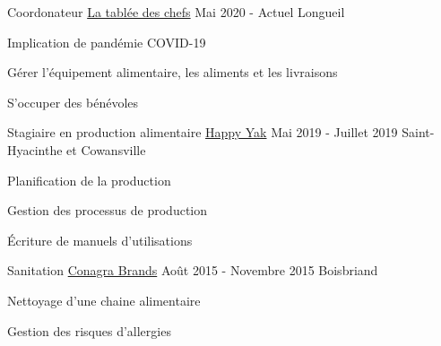 

\begin{cventries}

  \cventry
    {Coordonateur} %
    {\href{https://www.tableedeschefs.org/fr/}{La tablée des chefs}} %
    {Mai 2020 - Actuel} %
    {Longueil} %
    {
      \begin{cvitems} %
        \item {Implication de pandémie COVID-19}
        \item {Gérer l'équipement alimentaire, les aliments et les livraisons}
        \item {S'occuper des bénévoles}
      \end{cvitems}
    }

  \cventry
    {Stagiaire en production alimentaire} %
    {\href{https://happyyak.ca/fr/}{Happy Yak}} %
    {Mai 2019 - Juillet 2019} %
    {Saint-Hyacinthe et Cowansville} %
    {
      \begin{cvitems} %
        \item {Planification de la production}
        \item {Gestion des processus de production}
        \item {Écriture de manuels d'utilisations}
      \end{cvitems}
    }

  \cventry
    {Sanitation} %
    {\href{http://www.conagrabrands.ca/fr/brands}{Conagra Brands}} %
    {Août 2015 - Novembre 2015} %
    {Boisbriand} %
    {
      \begin{cvitems} %
        \item {Nettoyage d'une chaine alimentaire}
        \item {Gestion des risques d'allergies}
      \end{cvitems}
    }


\end{cventries}
